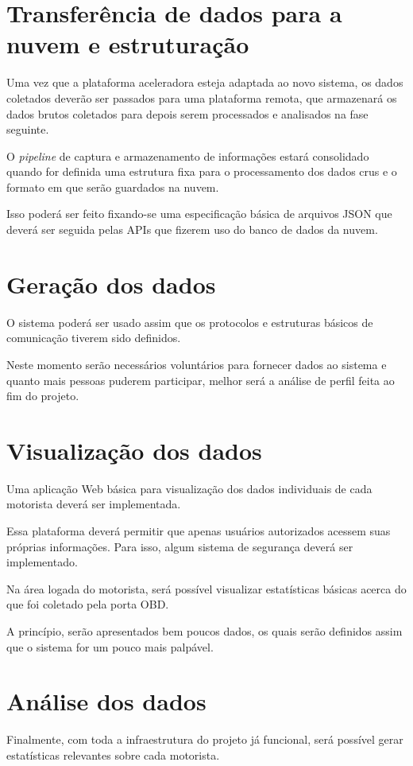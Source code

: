 \section{Transferência de dados para a nuvem e estruturação}
Uma vez que a plataforma aceleradora esteja adaptada ao novo sistema, os dados coletados deverão ser passados para uma plataforma remota, que armazenará os dados brutos coletados para depois serem processados e analisados na fase seguinte.

O \textit{pipeline} de captura e armazenamento de informações estará consolidado quando for definida uma estrutura fixa para o processamento dos dados crus e o formato em que serão guardados na nuvem.

Isso poderá ser feito fixando-se uma especificação básica de arquivos JSON que deverá ser seguida pelas APIs que fizerem uso do banco de dados da nuvem.

\section{Geração dos dados}
O sistema poderá ser usado assim que os protocolos e estruturas básicos de comunicação tiverem sido definidos. 

Neste momento serão necessários voluntários para fornecer dados ao sistema e quanto mais pessoas puderem participar, melhor será a análise de perfil feita ao fim do projeto.

\section{Visualização dos dados}
Uma aplicação Web básica para visualização dos dados individuais de cada motorista deverá ser implementada.

Essa plataforma deverá permitir que apenas usuários autorizados acessem suas próprias informações. Para isso, algum sistema de segurança deverá ser implementado.

Na área logada do motorista, será possível visualizar estatísticas básicas acerca do que foi coletado pela porta OBD.

A princípio, serão apresentados bem poucos dados, os quais serão definidos assim que o sistema for um pouco mais palpável. 

\section{Análise dos dados}
Finalmente, com toda a infraestrutura do projeto já funcional, será possível gerar estatísticas relevantes sobre cada motorista.


